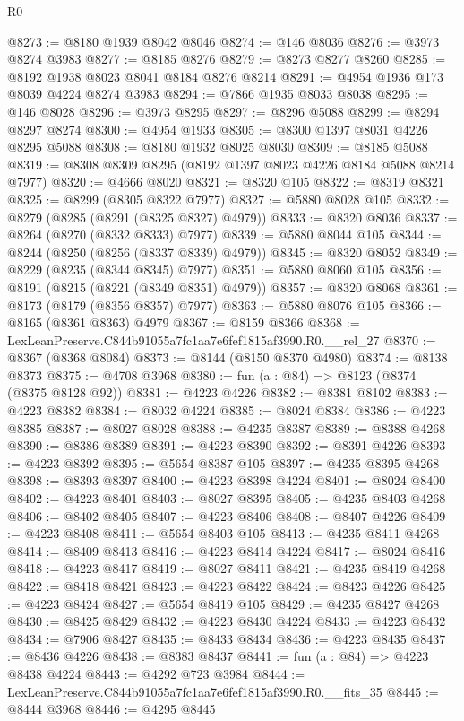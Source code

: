 \begin{lexlean}{R0}
\begin{coremodule}
@8273 := @8180 @1939 @8042 @8046
@8274 := @146 @8036
@8276 := @3973 @8274 @3983
@8277 := @8185 @8276
@8279 := @8273 @8277 @8260
@8285 := @8192 @1938 @8023 @8041 @8184 @8276 @8214
@8291 := @4954 @1936 @173 @8039 @4224 @8274 @3983
@8294 := @7866 @1935 @8033 @8038
@8295 := @146 @8028
@8296 := @3973 @8295
@8297 := @8296 @5088
@8299 := @8294 @8297 @8274
@8300 := @4954 @1933
@8305 := @8300 @1397 @8031 @4226 @8295 @5088
@8308 := @8180 @1932 @8025 @8030
@8309 := @8185 @5088
@8319 := @8308 @8309 @8295 (@8192 @1397 @8023 @4226 @8184 @5088 @8214 @7977)
@8320 := @4666 @8020
@8321 := @8320 @105
@8322 := @8319 @8321
@8325 := @8299 (@8305 @8322 @7977)
@8327 := @5880 @8028 @105
@8332 := @8279 (@8285 (@8291 (@8325 @8327) @4979))
@8333 := @8320 @8036
@8337 := @8264 (@8270 (@8332 @8333) @7977)
@8339 := @5880 @8044 @105
@8344 := @8244 (@8250 (@8256 (@8337 @8339) @4979))
@8345 := @8320 @8052
@8349 := @8229 (@8235 (@8344 @8345) @7977)
@8351 := @5880 @8060 @105
@8356 := @8191 (@8215 (@8221 (@8349 @8351) @4979))
@8357 := @8320 @8068
@8361 := @8173 (@8179 (@8356 @8357) @7977)
@8363 := @5880 @8076 @105
@8366 := @8165 (@8361 @8363) @4979
@8367 := @8159 @8366
@8368 := LexLeanPreserve.C844b91055a7fc1aa7e6fef1815af3990.R0.__rel_27
@8370 := @8367 (@8368 @8084)
@8373 := @8144 (@8150 @8370 @4980)
@8374 := @8138 @8373
@8375 := @4708 @3968
@8380 := fun (a : @84) => @8123 (@8374 (@8375 @8128 @92))
@8381 := @4223 @4226
@8382 := @8381 @8102
@8383 := @4223 @8382
@8384 := @8032 @4224
@8385 := @8024 @8384
@8386 := @4223 @8385
@8387 := @8027 @8028
@8388 := @4235 @8387
@8389 := @8388 @4268
@8390 := @8386 @8389
@8391 := @4223 @8390
@8392 := @8391 @4226
@8393 := @4223 @8392
@8395 := @5654 @8387 @105
@8397 := @4235 @8395 @4268
@8398 := @8393 @8397
@8400 := @4223 @8398 @4224
@8401 := @8024 @8400
@8402 := @4223 @8401
@8403 := @8027 @8395
@8405 := @4235 @8403 @4268
@8406 := @8402 @8405
@8407 := @4223 @8406
@8408 := @8407 @4226
@8409 := @4223 @8408
@8411 := @5654 @8403 @105
@8413 := @4235 @8411 @4268
@8414 := @8409 @8413
@8416 := @4223 @8414 @4224
@8417 := @8024 @8416
@8418 := @4223 @8417
@8419 := @8027 @8411
@8421 := @4235 @8419 @4268
@8422 := @8418 @8421
@8423 := @4223 @8422
@8424 := @8423 @4226
@8425 := @4223 @8424
@8427 := @5654 @8419 @105
@8429 := @4235 @8427 @4268
@8430 := @8425 @8429
@8432 := @4223 @8430 @4224
@8433 := @4223 @8432
@8434 := @7906 @8427
@8435 := @8433 @8434
@8436 := @4223 @8435
@8437 := @8436 @4226
@8438 := @8383 @8437
@8441 := fun (a : @84) => @4223 @8438 @4224
@8443 := @4292 @723 @3984
@8444 := LexLeanPreserve.C844b91055a7fc1aa7e6fef1815af3990.R0.__fits_35
@8445 := @8444 @3968
@8446 := @4295 @8445

\end{coremodule}
\end{lexlean}
